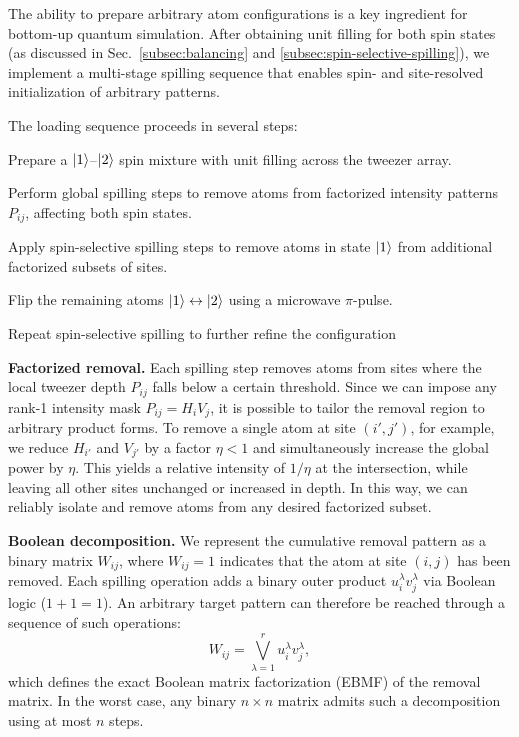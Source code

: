 The ability to prepare arbitrary atom configurations is a key ingredient for bottom-up quantum simulation. After obtaining unit filling for both spin states (as discussed in Sec.~\ref{subsec:balancing} and \ref{subsec:spin-selective-spilling}), we implement a multi-stage spilling sequence that enables spin- and site-resolved initialization of arbitrary patterns.

The loading sequence proceeds in several steps: \vspace{-6pt}
\begin{enumerate*}
    \item Prepare a $\left| 1 \right\rangle$–$\left| 2 \right\rangle$ spin mixture with unit filling across the tweezer array.
    \item Perform global spilling steps to remove atoms from factorized intensity patterns $P_{ij}$, affecting both spin states.
    \item Apply spin-selective spilling steps to remove atoms in state $\left| 1 \right\rangle$ from additional factorized subsets of sites.
    \item Flip the remaining atoms $\left| 1 \right\rangle \leftrightarrow \left| 2 \right\rangle$ using a microwave $\pi$-pulse.
    \item Repeat spin-selective spilling to further refine the configuration
\end{enumerate*}

\textbf{Factorized removal.}
Each spilling step removes atoms from sites where the local tweezer depth $P_{ij}$ falls below a certain threshold. Since we can impose any rank-1 intensity mask $P_{ij} = H_i V_j$, it is possible to tailor the removal region to arbitrary product forms. To remove a single atom at site $(i', j')$, for example, we reduce $H_{i'}$ and $V_{j'}$ by a factor $\eta < 1$ and simultaneously increase the global power by $\eta$. This yields a relative intensity of $1/\eta$ at the intersection, while leaving all other sites unchanged or increased in depth. In this way, we can reliably isolate and remove atoms from any desired factorized subset.

\textbf{Boolean decomposition.}
We represent the cumulative removal pattern as a binary matrix $W_{ij}$, where $W_{ij} = 1$ indicates that the atom at site $(i, j)$ has been removed. Each spilling operation adds a binary outer product $u^\lambda_i v^\lambda_j$ via Boolean logic ($1 + 1 = 1$). An arbitrary target pattern can therefore be reached through a sequence of such operations:
\begin{equation}
    \label{eq:ebmf}
    W_{ij} = \bigvee_{\lambda=1}^{r} u^\lambda_i v^\lambda_j,
\end{equation}
which defines the exact Boolean matrix factorization (EBMF) of the removal matrix. In the worst case, any binary $n \times n$ matrix admits such a decomposition using at most $n$ steps.

